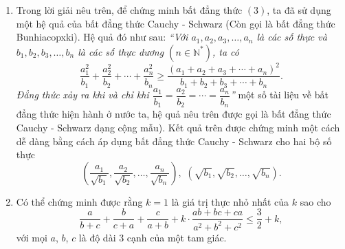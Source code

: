 \begin{bt}
{		\begin{nx}\hfill
			\begin{enumerate}
				\item Trong lời giải nêu trên, để chứng minh bất đẳng thức $(3)$, ta đã sử dụng một hệ quả của bất đẳng thức Cauchy - Schwarz (Còn gọi là bất đẳng thức Bunhiacopxki). Hệ quả đó như sau:
				\textit{``Với $a_1, a_2, a_3, \ldots , a_n$ là các số thực và $b_1, b_2, b_3, \ldots , b_n $ là các số thực dương $(n\in \mathbb{N^*})$, ta có
					\[\dfrac{a_1^2}{b_1}+\dfrac{a_2^2}{b_2}+\cdots +\dfrac{a_n^2}{b_n}\ge \dfrac{(a_1+a_2+a_3+\cdots +a_n)^2}{b_1+b_2+b_3+\cdots +b_n}. \]
					Đẳng thức xảy ra khi và chỉ khi
					$\dfrac{a_1}{b_1}=\dfrac{a_2}{b_2}=\cdots =\dfrac{a_n}{b_n}$''}
 một số tài liệu về bất đẳng thức hiện hành ở nước ta, hệ quả nêu trên được gọi là bất đẳng thức Cauchy - Schwarz dạng cộng mẫu).
				Kết quả trên được chứng minh một cách dễ dàng bằng cách áp dụng bất đẳng thức  Cauchy - Schwarz cho hai bộ số thực $$\left(\dfrac{a_1}{\sqrt{b_1}},\dfrac{a_2}{\sqrt{b_2}},\ldots , \dfrac{a_n}{\sqrt{b_n}}\right), \,\, (\sqrt{b_1}, \sqrt{b_2},\ldots , \sqrt{b_n}).$$
				\item Có thể chứng minh được rằng $k=1$ là giá trị thực nhỏ nhất của $k$ sao cho 
				\[\dfrac{a}{b+c}+\dfrac{b}{c+a}+\dfrac{c}{a+b}+k\cdot\dfrac{ab+bc+ca}{a^2+b^2+c^2}\le \dfrac{3}{2}+k,\]
				với mọi $a$, $b$, $c$ là độ dài $3$ cạnh của một tam giác.
			\end{enumerate}
		\end{nx}
	}
\end{bt}
